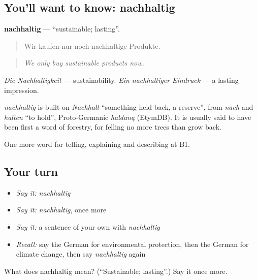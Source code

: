 \subsection*{You'll want to know: nachhaltig}
\textbf{nachhaltig} — \textquotedblleft{}sustainable; lasting\textquotedblright{}.

\begin{quote}
Wir kaufen nur noch nachhaltige Produkte.
\end{quote}

\begin{quote}
\emph{We only buy sustainable products now.}
\end{quote}

\emph{Die Nachhaltigkeit} — sustainability. \emph{Ein nachhaltiger Eindruck} — a lasting impression.

\begin{cousinweb}
\emph{nachhaltig} is built on \emph{Nachhalt} \textquotedblleft{}something held back, a reserve\textquotedblright{}, from \emph{nach} and \emph{halten} \textquotedblleft{}to hold\textquotedblright{}, Proto-Germanic \emph{haldaną} (EtymDB). It is usually said to have been first a word of forestry, for felling no more trees than grow back.
\end{cousinweb}

\begin{grammarlens}[title={What you've built}]
One more word for telling, explaining and describing at B1.
\end{grammarlens}

\subsection*{Your turn}
\begin{itemize}
\raggedright
  \item \emph{Say it:} \emph{nachhaltig}
  \item \emph{Say it:} \emph{nachhaltig}, once more
  \item \emph{Say it:} a sentence of your own with \emph{nachhaltig}
  \item \emph{Recall:} say the German for environmental protection, then the German for climate change, then say \emph{nachhaltig} again
\end{itemize}

\begin{tcolorbox}[breakable,colback=teal!4,colframe=teal!35!black,title={Before you move on}]
What does nachhaltig mean? (\textquotedblleft{}Sustainable; lasting\textquotedblright{}.) Say it once more.
\end{tcolorbox}

